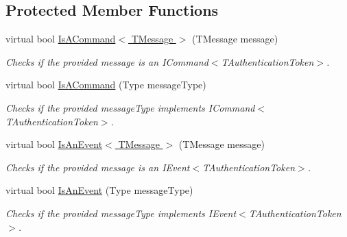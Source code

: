 \subsection*{Protected Member Functions}
\begin{DoxyCompactItemize}
\item 
virtual bool \hyperlink{classCqrs_1_1Bus_1_1RouteManager_a1ee8d583bb5d75a54cdac03c8e84b8d9_a1ee8d583bb5d75a54cdac03c8e84b8d9}{Is\+A\+Command$<$ T\+Message $>$} (T\+Message message)
\begin{DoxyCompactList}\small\item\em Checks if the provided {\itshape message}  is an I\+Command$<$\+T\+Authentication\+Token$>$. \end{DoxyCompactList}\item 
virtual bool \hyperlink{classCqrs_1_1Bus_1_1RouteManager_a7b7bfc4db30cc5956c4acd6a342e9159_a7b7bfc4db30cc5956c4acd6a342e9159}{Is\+A\+Command} (Type message\+Type)
\begin{DoxyCompactList}\small\item\em Checks if the provided {\itshape message\+Type}  implements I\+Command$<$\+T\+Authentication\+Token$>$. \end{DoxyCompactList}\item 
virtual bool \hyperlink{classCqrs_1_1Bus_1_1RouteManager_a7e5099741cd4b3e538599c771581a4b6_a7e5099741cd4b3e538599c771581a4b6}{Is\+An\+Event$<$ T\+Message $>$} (T\+Message message)
\begin{DoxyCompactList}\small\item\em Checks if the provided {\itshape message}  is an I\+Event$<$\+T\+Authentication\+Token$>$. \end{DoxyCompactList}\item 
virtual bool \hyperlink{classCqrs_1_1Bus_1_1RouteManager_a7b9b2ad8b9f5d7761b0f45c033b96101_a7b9b2ad8b9f5d7761b0f45c033b96101}{Is\+An\+Event} (Type message\+Type)
\begin{DoxyCompactList}\small\item\em Checks if the provided {\itshape message\+Type}  implements I\+Event$<$\+T\+Authentication\+Token$>$. \end{DoxyCompactList}\end{DoxyCompactItemize}
